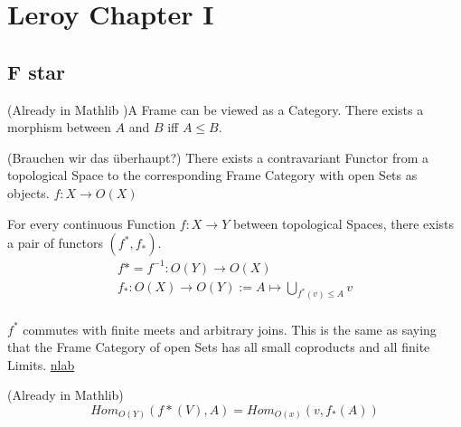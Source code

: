 \chapter{Leroy Chapter I}


\section{F star}

\begin{definition}[Frame]
    \label{lem:frame}
    (Already in Mathlib )A Frame can be viewed as a Category.
    There exists a morphism between $A$ and $B$ iff $A \le B$.
    \leanok
\end{definition}

\begin{definition}
    \label{def:top_frame_func}
    (Brauchen wir das überhaupt?) There exists a contravariant Functor from a topological Space to the corresponding Frame Category with open Sets as objects. $f: X \rightarrow O(X)$
\end{definition}

\begin{definition}[$f^*$ and $f_*$]
    \label{def:f_star}
    \leanok
    For every continuous Function $f : X \rightarrow Y$ between topological Spaces, there exists a pair of functors $(f^*,f_*)$.
    \begin{gather*}
        f* = f^{-1} : O(Y) \rightarrow O(X)\\
        f_* : O(X) \rightarrow O(Y) := A \mapsto \bigcup_{f^*(v) \le A} v\\
    \end{gather*}
\end{definition}

\begin{lemma}[$f^*$ commutes]
    \label{lem:f_star_comm}

    $f^*$ commutes with finite meets and arbitrary joins. This is the same as saying that the Frame Category of open Sets has all small coproducts and all finite Limits. \href{https://ncatlab.org/nlab/show/frame}{nlab}
\end{lemma}

\begin{lemma}[Homsets]
    \label{lem:f_star_homsets}
    \leanok
    (Already in Mathlib)
    \[Hom_{O(Y)}(f*(V), A) = Hom_{O(x)}(v, f_*(A))\]
\end{lemma}


